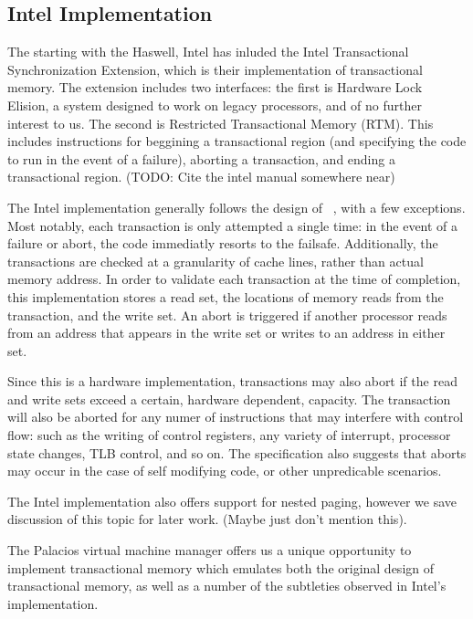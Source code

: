 \documentclass{acm_proc_article-sp}
\begin{document}
\subsection{Intel Implementation}

The starting with the Haswell, Intel has inluded the Intel Transactional
Synchronization Extension, which is their implementation of transactional
memory. The extension includes two interfaces: the first is Hardware Lock
Elision, a system designed to work on legacy processors, and of no further
interest to us. The second is Restricted Transactional Memory (RTM). This 
includes instructions for beggining a transactional region (and specifying the
code to run in the event of a failure), aborting a transaction, and ending a 
transactional region. (TODO: Cite the intel manual somewhere near)

The Intel implementation generally follows the design of 
~\cite{Herlihy:1993:TMA:173682.165164}, with a few exceptions.
Most notably, each transaction is only attempted a single time: in the event
of a failure or abort, the code immediatly resorts to the failsafe. 
Additionally, the transactions are checked at a granularity of cache lines, 
rather than actual memory address. In order to validate each transaction at the
time of completion, this implementation stores a read set, the locations of
memory reads from the transaction, and the write set. An abort is triggered
if another processor reads from an address that appears in the write set or 
writes to an address in either set.

Since this is a hardware implementation, transactions may also abort if the 
read and write sets exceed a certain, hardware dependent, capacity. The 
transaction will also be aborted for any numer of instructions that may 
interfere with control flow: such as the writing of control registers, any 
variety of interrupt, processor state changes, TLB control, and so on. The 
specification also suggests that aborts may occur in the case of self modifying
code, or other unpredicable scenarios.

The Intel implementation also offers support for nested paging, however we
save discussion of this topic for later work. (Maybe just don't mention this). 

The Palacios virtual machine manager offers us a unique opportunity to
implement transactional memory which emulates both the original design of
transactional memory, as well as a number of the subtleties observed in 
Intel's implementation.
\end{document}
